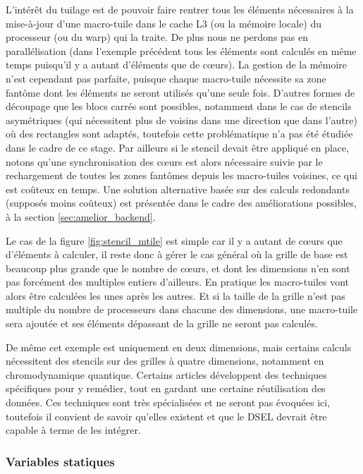 L'intérêt du tuilage est de pouvoir faire rentrer tous les éléments nécessaires à la mise-à-jour d'une macro-tuile dans le cache L3 (ou la mémoire locale) du processeur (ou du warp) qui la traite. De plus nous ne perdons pas en parallélisation (dans l'exemple précédent tous les éléments sont calculés en même temps puisqu'il y a autant d'éléments que de cœurs). La gestion de la mémoire n'est cependant pas parfaite, puisque chaque macro-tuile nécessite sa zone fantôme dont les éléments ne seront utilisés qu'une seule fois. D'autres formes de découpage que les blocs carrés sont possibles, notamment dans le cas de stencils asymétriques (qui nécessitent plus de voisins dans une direction que dans l'autre) où des rectangles sont adaptés, toutefois cette problématique n'a pas été étudiée dans le cadre de ce stage. Par ailleurs si le stencil devait être appliqué en place, notons qu'une synchronisation des cœurs est alors nécessaire suivie par le rechargement de toutes les zones fantômes depuis les macro-tuiles voisines, ce qui est coûteux en temps. Une solution alternative basée sur des calculs redondants (supposés moins coûteux) est présentée dans le cadre des améliorations possibles, à la section \ref{sec:amelior_backend}.

Le cas de la figure \ref{fig:stencil_mtile} est simple car il y a autant de cœurs que d'éléments à calculer, il reste donc à gérer le cas général où la grille de base est beaucoup plus grande que le nombre de cœurs, et dont les dimensions n'en sont pas forcément des multiples entiers d'ailleurs. En pratique les macro-tuiles vont alors être calculées les unes après les autres. Et si la taille de la grille n'est pas multiple du nombre de processeurs dans chacune des dimensions, une macro-tuile sera ajoutée et ses éléments dépassant de la grille ne seront pas calculés. 

De même cet exemple est uniquement en deux dimensions, mais certains calculs nécessitent des stencils sur des grilles à quatre dimensions, notamment en chromodynamique quantique. Certains articles \cite{Art1,Art11} développent des techniques spécifiques pour y remédier, tout en gardant une certaine réutilisation des données. Ces techniques sont très spécialisées et ne seront pas évoquées ici, toutefois il convient de savoir qu'elles existent et que le DSEL devrait être capable à terme de les intégrer.

\subsubsection*{Variables statiques}

